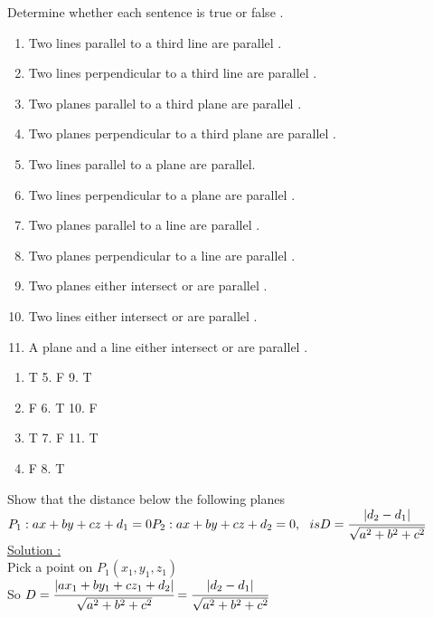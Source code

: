 \begin{example}
Determine whether each sentence is true or false .
\begin{enumerate}
    \item Two lines parallel to a third line are parallel .
    \item Two lines perpendicular to a third line are parallel .
    \item Two planes parallel to a third plane are parallel .
    \item Two planes perpendicular to a third plane are parallel .
    \item Two lines parallel to a plane are parallel.
    \item Two lines perpendicular to a plane are parallel .
    \item Two planes parallel to a line are parallel .
       \item Two planes perpendicular to a line are parallel .
       \item Two planes either intersect or are parallel .
       \item Two lines either intersect or are parallel .
       \item A plane and a line either intersect or are parallel .
    
\end{enumerate}
{}
\begin{enumerate}
\item T \hspace{2cm} 5. F \hspace{2cm} 9. T
\item F \hspace{2cm} 6. T \hspace{2cm} 10. F
\item T \hspace{2cm} 7. F \hspace{2cm} 11. T
\item F \hspace{2cm} 8. T  
\end{enumerate}
\end{example}
\noindent{\color{smalt(darkpowderblue)}\rule{\linewidth}{.2mm}}
\begin{example}
Show that the distance below the following planes \\
$P_1 : ax+by+cz+d_1=0 \\
P_2 : ax+by+cz+d_2=0 ,~~is  \\  D=\cfrac{|d_2-d_1|}{\sqrt{a^2+b^2+c^2}}$\\
{\color{smalt(darkpowderblue)}\underline{Solution :}} \\
Pick a point on $P_1(x_1,y_1,z_1)$ \\ So 
$D= {\cfrac{|ax_1+by_1+cz_1+d_2|}{\sqrt{a^2+b^2+c^2}} \\ = \cfrac{|d_2-d_1|}{\sqrt{a^2+b^2+c^2}}}$
\end{example}
